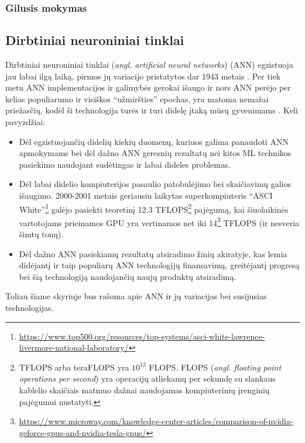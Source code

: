 \documentclass{VUMIFPSbakalaurinis}
\begin{document}
\subsubsection{Gilusis mokymas}

\subsection{Dirbtiniai neuroniniai tinklai}\label{subsec:neuro}
{
	Dirbtiniai neuroniniai tinklai (\textit{angl. artificial neural networks}) (ANN) egzistuoja jau labai ilgą laiką, pirmos jų variacijo pristatytos dar 1943 metais \cite{mcculloch_pitts_1943}. Per tiek metu ANN implementacijos ir galimybės gerokai išaugo ir nors ANN perėjo per kelias populiarumo ir visiškos \enquote{užmiršties} epochas, yra matoma nemažai priežasčių, kodėl ši technologija turės ir turi didelę įtaką mūsų gyvenimams \cite{handson}. Keli pavyzdžiai:
	\begin{itemize}
		\item Dėl egzistuojančių didelių kiekių duomenų, kuriuos galima panaudoti ANN apmokymams bei dėl dažno ANN geresnių rezultatų nei kitos ML technikos pasiekimo naudojant sudėtingas ir labai dideles problemas.
		
		\item Dėl labai didelio kompiuterijos pasaulio patobulėjimo bei skaičiavimų galios išaugimo. 2000-2001 metais geriausiu laikytas superkompiuteris \enquote{ASCI White}\footnote{\url{https://www.top500.org/resources/top-systems/asci-white-lawrence-livermore-national-laboratory/}} galėjo pasiekti teoretinį 12.3 TFLOPS\footnote{TFLOPS arba teraFLOPS yra \(10^{12}\) FLOPS. FLOPS (\textit{angl. floating point operations per second}) yra operacijų atliekamų per sekundę su slankaus kablelio skaičiais matmuo dažnai naudojamas kompiuterinių įrenginių pajėgumui nustatyti.} pajėgumą, kai šiuolaikinės vartotojams prieinamos GPU yra vertinamos net iki 14\footnote{\url{https://www.microway.com/knowledge-center-articles/comparison-of-nvidia-geforce-gpus-and-nvidia-tesla-gpus/}} TFLOPS (ir nesveria šimtų tonų).
		
		\item Dėl dažno ANN pasiekiamų rezultatų atsiradimo žinių akiratyje, kas lemia didėjantį ir taip populiarų ANN technologijų finansavimą, greitėjantį progresą bei šią technologiją naudojančių naujų produktų atsiradimą\cite{handson}.
	\end{itemize}
	
Toliau šiame skyriuje bus rašoma apie ANN ir jų variacijas bei susijusias technologijas.
}
\end{document}
